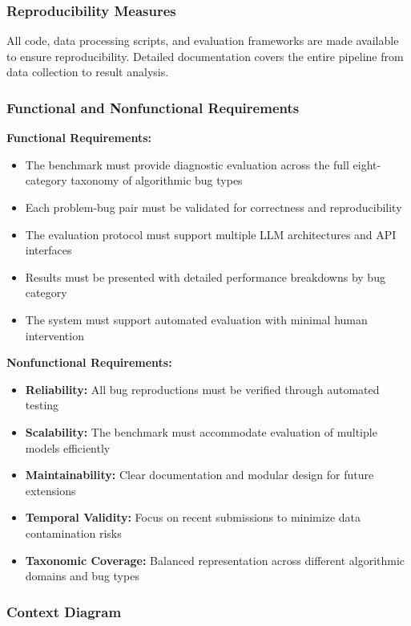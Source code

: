 \subsubsection{Reproducibility Measures}

All code, data processing scripts, and evaluation frameworks are made available to ensure reproducibility. Detailed documentation covers the entire pipeline from data collection to result analysis.

\subsubsection{Functional and Nonfunctional Requirements}

\textbf{Functional Requirements:}
\begin{itemize}
    \item The benchmark must provide diagnostic evaluation across the full eight-category taxonomy of algorithmic bug types
    \item Each problem-bug pair must be validated for correctness and reproducibility
    \item The evaluation protocol must support multiple LLM architectures and API interfaces
    \item Results must be presented with detailed performance breakdowns by bug category
    \item The system must support automated evaluation with minimal human intervention
\end{itemize}

\textbf{Nonfunctional Requirements:}
\begin{itemize}
    \item \textbf{Reliability:} All bug reproductions must be verified through automated testing
    \item \textbf{Scalability:} The benchmark must accommodate evaluation of multiple models efficiently
    \item \textbf{Maintainability:} Clear documentation and modular design for future extensions
    \item \textbf{Temporal Validity:} Focus on recent submissions to minimize data contamination risks
    \item \textbf{Taxonomic Coverage:} Balanced representation across different algorithmic domains and bug types
\end{itemize}

\subsubsection{Context Diagram}

